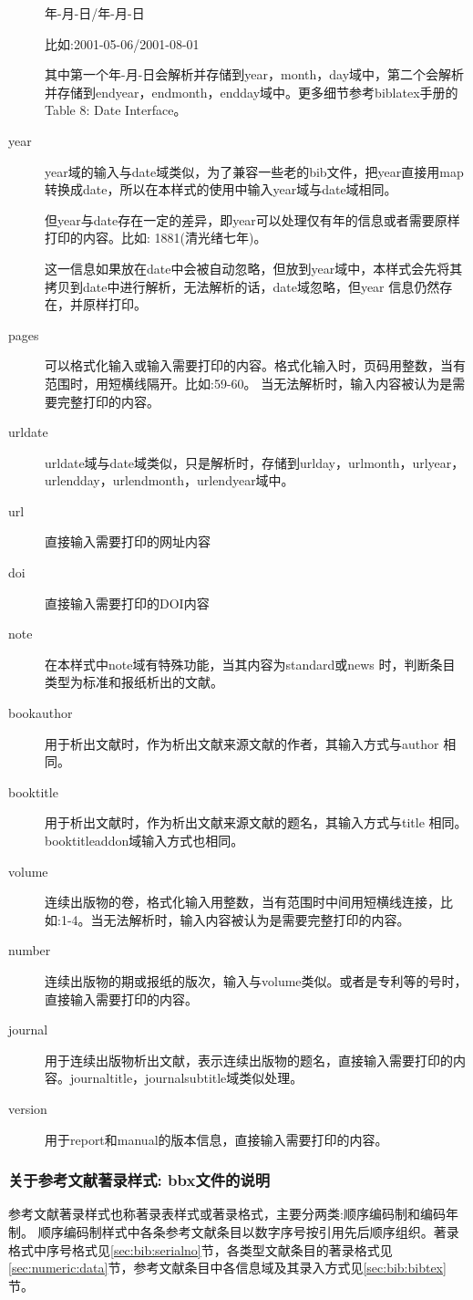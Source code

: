 \begin{description}
      年-月-日/年-月-日

      比如:2001-05-06/2001-08-01

      其中第一个年-月-日会解析并存储到year，month，day域中，第二个会解析并存储到endyear，endmonth，endday域中。更多细节参考biblatex手册的Table 8: Date Interface。

  \item[year] year域的输入与date域类似，为了兼容一些老的bib文件，把year直接用map 转换成date，所以在本样式的使用中输入year域与date域相同。

      但year与date存在一定的差异，即year可以处理仅有年的信息或者需要原样打印的内容。比如:
      1881(清光绪七年)。

      这一信息如果放在date中会被自动忽略，但放到year域中，本样式会先将其拷贝到date中进行解析，无法解析的话，date域忽略，但year 信息仍然存在，并原样打印。

  \item[pages] 可以格式化输入或输入需要打印的内容。格式化输入时，页码用整数，当有范围时，用短横线隔开。比如:59-60。 当无法解析时，输入内容被认为是需要完整打印的内容。
  \item[urldate] urldate域与date域类似，只是解析时，存储到urlday，urlmonth，urlyear，urlendday，urlendmonth，urlendyear域中。
  \item[url] 直接输入需要打印的网址内容
  \item[doi] 直接输入需要打印的DOI内容
  \item[note] 在本样式中note域有特殊功能，当其内容为standard或news 时，判断条目类型为标准和报纸析出的文献。
  \item[bookauthor] 用于析出文献时，作为析出文献来源文献的作者，其输入方式与author 相同。
  \item[booktitle] 用于析出文献时，作为析出文献来源文献的题名，其输入方式与title 相同。booktitleaddon域输入方式也相同。
  \item[volume] 连续出版物的卷，格式化输入用整数，当有范围时中间用短横线连接，比如:1-4。当无法解析时，输入内容被认为是需要完整打印的内容。
  \item[number] 连续出版物的期或报纸的版次，输入与volume类似。或者是专利等的号时，直接输入需要打印的内容。
  \item[journal] 用于连续出版物析出文献，表示连续出版物的题名，直接输入需要打印的内容。journaltitle，journalsubtitle域类似处理。
   \item[version] 用于report和manual的版本信息，直接输入需要打印的内容。
\end{description}


\subsubsection{关于参考文献著录样式: bbx文件的说明}\label{sec:usage:bbx}
参考文献著录样式也称著录表样式或著录格式，主要分两类:顺序编码制和编码年制。
顺序编码制样式中各条参考文献条目以数字序号按引用先后顺序组织。著录格式中序号格式见\ref{sec:bib:serialno}节，各类型文献条目的著录格式见\ref{sec:numeric:data}节，参考文献条目中各信息域及其录入方式见\ref{sec:bib:bibtex}节。

